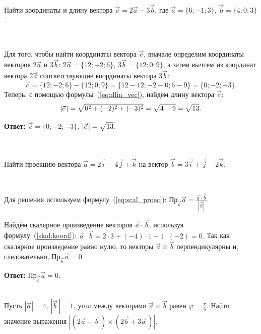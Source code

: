 \documentclass[10pt]{article}
\numberwithin{primer}{section}
\numberwithin{equation}{section}
\begin{document}
\noindent\hrulefill\,\,\hrulefill\vspace{4pt}\\
Найти координаты и длину вектора $\vec{c}=2\vec{a}-3\vec{b}$, где $\vec{a}=\{6;-1;3\}$, $\vec{b}=\{4;0;3\}$.\vspace{4pt}

\noindent{}\,\hrulefill\vspace{4pt}

Для того, чтобы найти координаты вектора $\vec{c}$, вначале определим координаты векторов $2\vec{a}$ и $3\vec{b}$:
$2\vec{a}=\{12;-2;6\}$, $3\vec{b}=\{12;0;9\}$, а затем вычтем из координат вектора $2\vec{a}$ соответствующие координаты вектора $3\vec{b}$:
\[
\vec{c}=\{12;-2;6\}-\{12;0;9\}=\{12-12;-2-0;6-9\}=\{0;-2;-3\}.
\]
Теперь, с помощью формулы~(\ref{eq:dlin_vec}), найдём длину вектора $\vec{c}$:
\[
\left|\vec{c}\,\right|=\sqrt{0^2+(-2)^2+(-3)^2\mathstrut}=\sqrt{4+9\mathstrut}=\sqrt{13\mathstrut}.
\]

\noindent\textbf{Ответ: }$\vec{c}=\{0;-2;-3\}$, $\left|\vec{c}\,\right|=\sqrt{13\mathstrut}$.\vspace{4pt}

\noindent\hrulefill\,\,\hrulefill\vspace{1pt}\\

\noindent{}\vspace{4pt}\\
Найти проекцию вектора $\vec{a}=2\vec{i}-4\vec{j}+\vec{k}$ на вектор $\vec{b}=3\vec{i}+\vec{j}-2\vec{k}$.\vspace{4pt}

\noindent{}\,\hrulefill\vspace{4pt}

Для решения используем формулу~(\ref{eq:scal_proec}): $Пр_{\vec{b}}\vec{a}=\tfrac{\vec{a}\cdot\vec{b}}{\left|\vec{b}\right|}$.

Найдём скалярное произведение векторов $\vec{a}\cdot\vec{b}$, используя формулу~(\ref{skal:koord}):
$
\vec{a}\cdot\vec{b}=2\cdot3+(-4)\cdot1+1\cdot(-2)=0.
$
Так как скалярное произведение равно нулю, то векторы $\vec{a}$ и $\vec{b}$ перпендикулярны и, следовательно, $Пр_{\vec{b}}\vec{a}=0$.

\noindent\textbf{Ответ: }$Пр_{\vec{b}}\vec{a}=0$.\vspace{4pt}

\noindent{}\vspace{4pt}\\
Пусть $\left|\vec{a}\right|=4$, $|\vec{b}\,|=1$, угол между векторами $\vec{a}$ и $\vec{b}$ равен $\varphi=\tfrac{\pi}{6}$. Найти значение выражения $\left|(2\vec{a}-\vec{b}\,)\times(2\vec{b}+3\vec{a}\,)\right|$.
\end{document}
